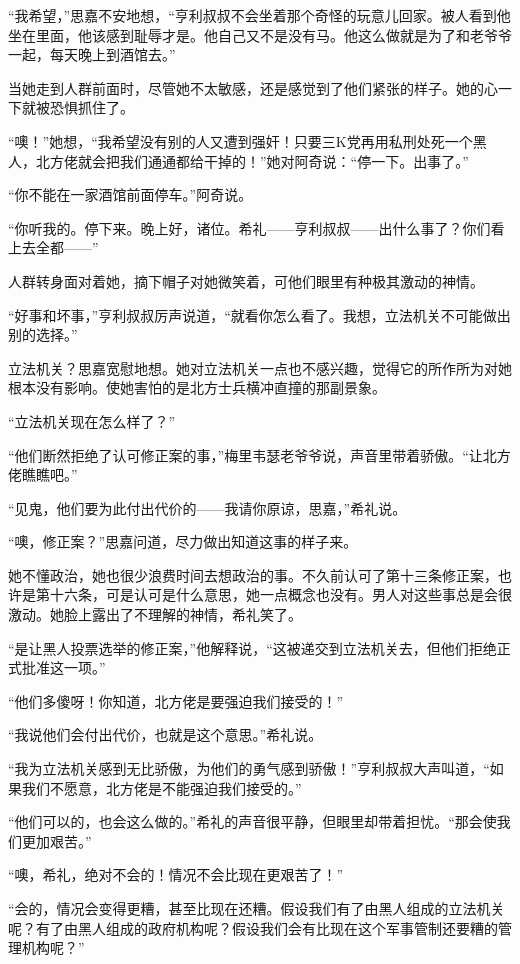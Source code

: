 \par “我希望，”思嘉不安地想，“亨利叔叔不会坐着那个奇怪的玩意儿回家。被人看到他坐在里面，他该感到耻辱才是。他自己又不是没有马。他这么做就是为了和老爷爷一起，每天晚上到酒馆去。”
\par 当她走到人群前面时，尽管她不太敏感，还是感觉到了他们紧张的样子。她的心一下就被恐惧抓住了。
\par “噢！”她想，“我希望没有别的人又遭到强奸！只要三K党再用私刑处死一个黑人，北方佬就会把我们通通都给干掉的！”她对阿奇说：“停一下。出事了。”
\par “你不能在一家酒馆前面停车。”阿奇说。
\par “你听我的。停下来。晚上好，诸位。希礼——亨利叔叔——出什么事了？你们看上去全都——”
\par 人群转身面对着她，摘下帽子对她微笑着，可他们眼里有种极其激动的神情。
\par “好事和坏事，”亨利叔叔厉声说道，“就看你怎么看了。我想，立法机关不可能做出别的选择。”
\par 立法机关？思嘉宽慰地想。她对立法机关一点也不感兴趣，觉得它的所作所为对她根本没有影响。使她害怕的是北方士兵横冲直撞的那副景象。
\par “立法机关现在怎么样了？”
\par “他们断然拒绝了认可修正案的事，”梅里韦瑟老爷爷说，声音里带着骄傲。“让北方佬瞧瞧吧。”
\par “见鬼，他们要为此付出代价的——我请你原谅，思嘉，”希礼说。
\par “噢，修正案？”思嘉问道，尽力做出知道这事的样子来。
\par 她不懂政治，她也很少浪费时间去想政治的事。不久前认可了第十三条修正案，也许是第十六条，可是认可是什么意思，她一点概念也没有。男人对这些事总是会很激动。她脸上露出了不理解的神情，希礼笑了。
\par “是让黑人投票选举的修正案，”他解释说，“这被递交到立法机关去，但他们拒绝正式批准这一项。”
\par “他们多傻呀！你知道，北方佬是要强迫我们接受的！”
\par “我说他们会付出代价，也就是这个意思。”希礼说。
\par “我为立法机关感到无比骄傲，为他们的勇气感到骄傲！”亨利叔叔大声叫道，“如果我们不愿意，北方佬是不能强迫我们接受的。”
\par “他们可以的，也会这么做的。”希礼的声音很平静，但眼里却带着担忧。“那会使我们更加艰苦。”
\par “噢，希礼，绝对不会的！情况不会比现在更艰苦了！”
\par “会的，情况会变得更糟，甚至比现在还糟。假设我们有了由黑人组成的立法机关呢？有了由黑人组成的政府机构呢？假设我们会有比现在这个军事管制还要糟的管理机构呢？”
